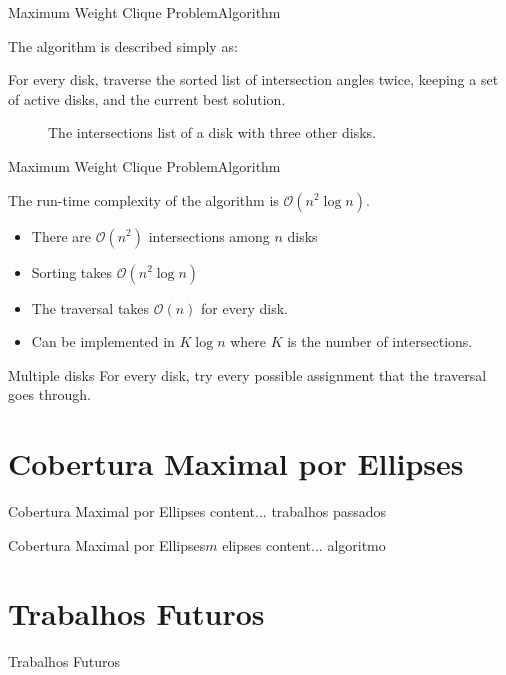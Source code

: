\documentclass{beamer}
\newcommand{\bigO}{\mathscr{O}}
\begin{document}
\begin{frame}{Maximum Weight Clique Problem}{Algorithm}
	
	The algorithm is described simply as:
	
	For every disk, traverse the sorted list of intersection angles twice, keeping a set of active disks, and the current best solution.
	
\begin{figure}[H]
	\centering
	
	\caption{The intersections list of a disk with three other disks.}
	
	\label{fig:array_disks}
\end{figure}
\end{frame}


\begin{frame}{Maximum Weight Clique Problem}{Algorithm}
	
	The run-time complexity of the algorithm is $\bigO(n^2\log{n})$.
	
	\begin{itemize}
		\item There are $\bigO(n^2)$ intersections among $n$ disks
		
		\item Sorting takes $\bigO(n^2\log{n})$
		
		\item The traversal takes $\bigO(n)$ for every disk.
		
		\item Can be implemented in $K\log{n}$ where $K$ is the number of intersections. 
	\end{itemize}

\begin{block}{Multiple disks}
	For every disk, try every possible assignment that the traversal goes through.
\end{block}
	

	
	
\end{frame}

\section{Cobertura Maximal por Ellipses}

\begin{frame}{Cobertura Maximal por Ellipses}
	content... trabalhos passados
\end{frame}

\begin{frame}{Cobertura Maximal por Ellipses}{$m$ elipses}
	content... algoritmo
\end{frame}

\section{Trabalhos Futuros}

\begin{frame}{Trabalhos Futuros}

\end{frame}
\end{document}
